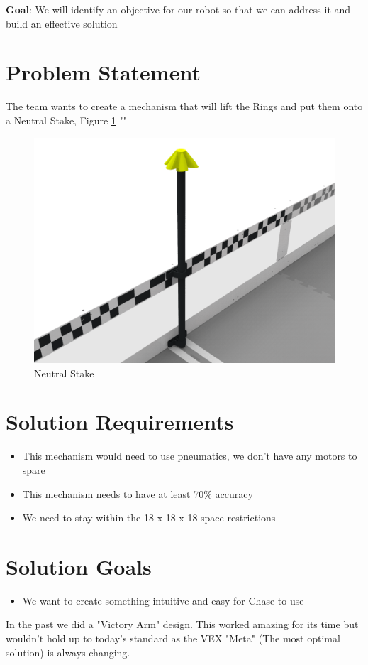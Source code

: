 \textbf{Goal}: We will identify an objective for our robot so that we can address it and build an effective solution
\section*{Problem Statement}
The team wants to create a mechanism that will lift the Rings and put them onto a Neutral Stake, Figure \ref{fig:neutral-stake} "\cite{RECF}"
\begin{figure}[H]
    \centering
    \includegraphics[width=0.5\linewidth]{images/Neutral Stake.png}
    \caption{Neutral Stake}
    \label{fig:neutral-stake}
\end{figure}
\section*{Solution Requirements}
\begin{itemize}
    \item This mechanism would need to use pneumatics, we don't have any motors to spare
    \item This mechanism needs to have at least 70\% accuracy 
    \item We need to stay within the 18 x 18 x 18 space restrictions 
\end{itemize}
\section*{Solution Goals}
\begin{itemize}
    \item We want to create something intuitive and easy for Chase to use
\end{itemize}

In the past we did a "Victory Arm" design. This worked amazing for its time but wouldn't hold up to today's standard as the VEX "Meta" (The most optimal solution) is always changing.
